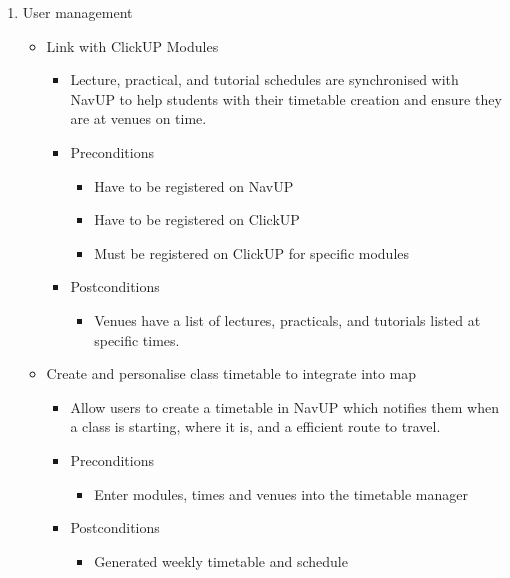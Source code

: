 \documentclass[12pt]{article}
\begin{document}
\begin{enumerate}
			\item User management
			\begin{itemize}
				\item Link with ClickUP Modules
				\begin{itemize}
					\item Lecture, practical, and tutorial schedules are synchronised with NavUP to help students with their timetable creation and ensure they are at venues on time.
					\item Preconditions
					\begin{itemize}
						\item Have to be registered on NavUP
						\item Have to be registered on ClickUP
						\item Must be registered on ClickUP for specific modules
					\end{itemize}
					\item Postconditions
					\begin{itemize}
						\item Venues have a list of lectures, practicals, and tutorials listed at specific times.
					\end{itemize}
				\end{itemize}
				
				\item Create and personalise class timetable to integrate into map
				\begin{itemize}
					\item Allow users to create a timetable in NavUP which notifies them when a class is starting, where it is, and a efficient route to travel.
					\item Preconditions
					\begin{itemize}
						\item Enter modules, times and venues into the timetable manager
					\end{itemize}
					\item Postconditions
					\begin{itemize}
						\item Generated weekly timetable and schedule
					\end{itemize}
				\end{itemize}
				

\end{itemize}
\end{enumerate}
\end{document}
